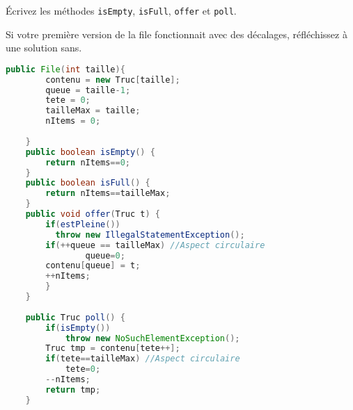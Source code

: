 \documentclass[iutinfo,a4paper,nocorrections,10pt]{ustl-tdtp}
\begin{document}
\question Écrivez les méthodes \texttt{isEmpty}, \texttt{isFull}, \texttt{offer} et \texttt{poll}.

\question Si votre première version de la file fonctionnait avec des décalages, réfléchissez à une solution sans.

\begin{correction}
{\color{red}
\begin{lstlisting}[language=Java]
	public File(int taille){
		contenu = new Truc[taille];
		queue = taille-1;
		tete = 0;
		tailleMax = taille;
		nItems = 0;
		
	}
	public boolean isEmpty() {
		return nItems==0;
	}
	public boolean isFull() {
		return nItems==tailleMax;
	}
	public void offer(Truc t) {
		if(estPleine())
		  throw new IllegalStatementException();
        if(++queue == tailleMax) //Aspect circulaire
				queue=0;
		contenu[queue] = t;
		++nItems;
		}
	}
	
	public Truc poll() {
		if(isEmpty())
		    throw new NoSuchElementException();
		Truc tmp = contenu[tete++];
		if(tete==tailleMax) //Aspect circulaire
			tete=0; 
		--nItems;
		return tmp;
	}
	
\end{lstlisting}

}
\end{correction}
\end{document}

